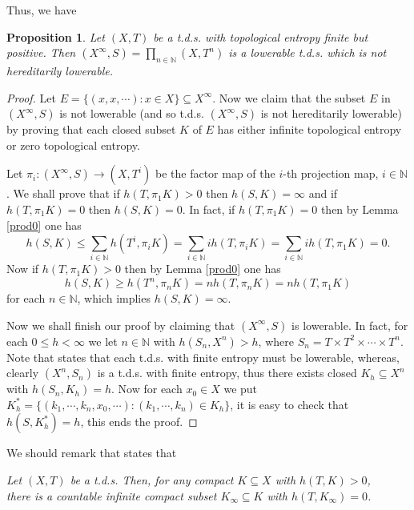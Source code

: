\documentclass[12pt]{amsart}
\newtheorem{prop}[thm]{Proposition}
\theoremstyle{definition} \theoremstyle{question}
\numberwithin{equation}{section}
\begin{document}
Thus, we have

\begin{prop} \label{090507}
Let $(X, T)$ be a t.d.s. with topological entropy finite but
positive. Then $(X^\infty, S)= \prod_{n\in {\mathbb N}} (X, T^n)$ is a
lowerable t.d.s. which is not hereditarily lowerable.
\end{prop}
\begin{proof}
Let $E= \{(x, x, \cdots): x\in X\}\subseteq X^\infty$. Now we claim
that the subset $E$ in $(X^\infty, S)$ is not lowerable (and so
t.d.s. $(X^\infty, S)$ is not hereditarily lowerable) by proving
that each closed subset $K$ of $E$ has either infinite topological
entropy or zero topological entropy.

Let $\pi_i: (X^\infty, S)\rightarrow (X, T^i)$ be the factor map of
the $i$-th projection map, $i\in {\mathbb N}$. We shall prove that if $h (T,
\pi_1 K)> 0$ then $h (S, K)= \infty$ and if $h (T, \pi_1 K)= 0$ then
$h (S, K)= 0$. In fact, if $h (T, \pi_1 K)= 0$ then by Lemma
\ref{prod0} one has
\begin{equation*}
h (S, K)\le \sum_{i\in {\mathbb N}} h (T^i, \pi_i K)= \sum_{i\in {\mathbb N}} i h(T,
\pi_i K)= \sum_{i\in {\mathbb N}} i h(T, \pi_1 K)= 0.
\end{equation*}
Now if $h (T, \pi_1 K)> 0$ then by Lemma \ref{prod0} one has
$$h (S,
K)\ge h(T^n, \pi_n K)= n h (T, \pi_n K)= n h(T, \pi_1 K)$$
for each
$n\in {\mathbb N}$, which implies $h (S, K)= \infty$.

Now we shall finish our proof by claiming that $(X^\infty, S)$ is
lowerable. In fact, for each $0\le h< \infty$ we let $n\in {\mathbb N}$ with
$h (S_n, X^n)> h$, where $S_n= T\times T^2\times \cdots \times T^n$.
Note that \cite[Theorem 4.4]{HYZ1} states that each t.d.s.
with finite entropy must be lowerable, whereas, clearly $(X^n, S_n)$
is a t.d.s. with finite entropy, thus there exists closed
$K_h\subseteq X^n$ with $h (S_n, K_h)= h$. Now for each $x_0\in X$
we put $K^*_h= \{(k_1, \cdots, k_n, x_0, \cdots): (k_1, \cdots,
k_n)\in K_h\}$, it is easy to check that $h (S, K^*_h)= h$, this
ends the proof.
\end{proof}

We should remark that \cite[Theorem 6.1]{HYZ1} states that
\begin{center}
{\it Let $(X,T)$ be a t.d.s. Then, for any compact $K\subseteq X$
with $h (T, K)> 0$,\\ there is a countable infinite compact subset
$K_\infty\subseteq K$ with $h (T, K_\infty)= 0$.}
\end{center}
\end{document}
